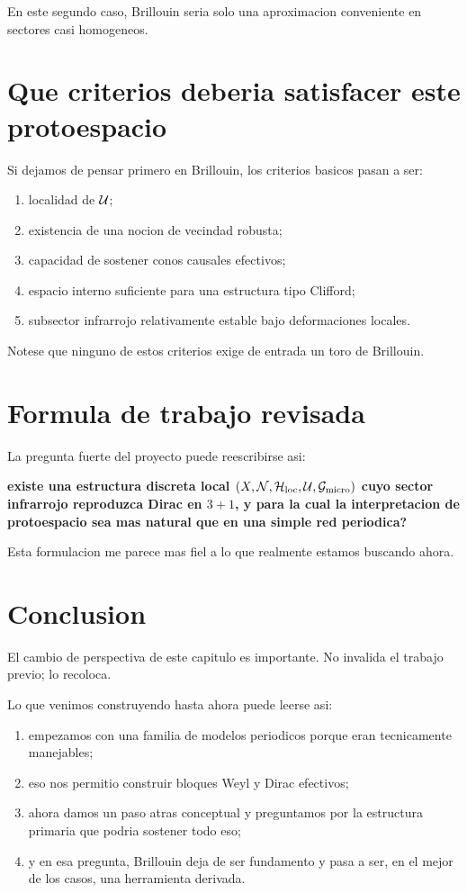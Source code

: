 En este segundo caso, Brillouin seria solo una aproximacion conveniente en sectores casi homogeneos.

\section{Que criterios deberia satisfacer este protoespacio}
Si dejamos de pensar primero en Brillouin, los criterios basicos pasan a ser:
\begin{enumerate}[label=\arabic*.]
    \item localidad de \(\mathcal{U}\);
    \item existencia de una nocion de vecindad robusta;
    \item capacidad de sostener conos causales efectivos;
    \item espacio interno suficiente para una estructura tipo Clifford;
    \item subsector infrarrojo relativamente estable bajo deformaciones locales.
\end{enumerate}

Notese que ninguno de estos criterios exige de entrada un toro de Brillouin.

\section{Formula de trabajo revisada}
La pregunta fuerte del proyecto puede reescribirse asi:
\begin{displayquote}
\textbf{existe una estructura discreta local \((X,\mathcal{N},\mathcal{H}_{\mathrm{loc}},\mathcal{U},\mathcal{G}_{\mathrm{micro}})\) cuyo sector infrarrojo reproduzca Dirac en \(3+1\), y para la cual la interpretacion de protoespacio sea mas natural que en una simple red periodica?}
\end{displayquote}

Esta formulacion me parece mas fiel a lo que realmente estamos buscando ahora.

\section{Conclusion}
El cambio de perspectiva de este capitulo es importante. No invalida el trabajo previo; lo recoloca.

Lo que venimos construyendo hasta ahora puede leerse asi:
\begin{enumerate}[label=\arabic*.]
    \item empezamos con una familia de modelos periodicos porque eran tecnicamente manejables;
    \item eso nos permitio construir bloques Weyl y Dirac efectivos;
    \item ahora damos un paso atras conceptual y preguntamos por la estructura primaria que podria sostener todo eso;
    \item y en esa pregunta, Brillouin deja de ser fundamento y pasa a ser, en el mejor de los casos, una herramienta derivada.
\end{enumerate}

